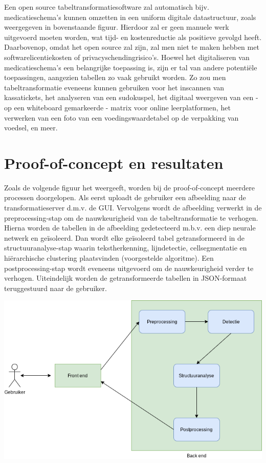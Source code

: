 \documentclass[a0,portrait]{a0poster}
\begin{document}
\begin{multicols}{2}
\noindent Een open source tabeltransformatiesoftware zal automatisch bijv. medicatieschema’s kunnen omzetten in een uniform digitale datastructuur, zoals weergegeven in bovenstaande figuur. Hierdoor zal er geen manuele werk uitgevoerd moeten worden, wat tijd- en kostenreductie als positieve gevolgd heeft. Daarbovenop, omdat het open source zal zijn, zal men niet te maken hebben met softwarelicentiekosten of privacyschendingrisico's. Hoewel het digitaliseren van medicatieschema’s een belangrijke toepassing is, zijn er tal van andere potentiële toepassingen, aangezien tabellen zo vaak gebruikt worden. Zo zou men tabeltransformatie eveneens kunnen gebruiken voor het inscannen van kassatickets, het analyseren van een sudokuspel, het digitaal weergeven van een - op een whiteboard gemarkeerde - matrix voor online leerplatformen, het verwerken van een foto van een voedingswaardetabel op de verpakking van voedsel, en meer.
\color{Black} %
\color{HoGentAccent1} 
\section*{Proof-of-concept en resultaten}
\color{black}
Zoals de volgende figuur het weergeeft, worden bij de proof-of-concept meerdere processen doorgelopen. Als eerst uploadt de gebruiker een afbeelding naar de transformatieserver d.m.v. de GUI. Vervolgens wordt de afbeelding verwerkt in de preprocessing-stap om de nauwkeurigheid van de tabeltransformatie te verhogen. Hierna worden de tabellen in de afbeelding gedetecteerd m.b.v. een diep neurale netwerk en geïsoleerd. Dan wordt elke geïsoleerd tabel getransformeerd in de structuuranalyse-stap waarin tekstherkenning, lijndetectie, cellsegmentatie en hiërarchische clustering plaatsvinden (voorgestelde algoritme). Een postprocessing-stap wordt eveneens uitgevoerd om de nauwkeurigheid verder te verhogen. Uiteindelijk worden de getransformeerde tabellen in JSON-formaat teruggestuurd naar de gebruiker.

\begin{center}\vspace{1cm}
\includegraphics[width=0.8\linewidth]{proof_of_concept_architectuur.png}
\end{center}\vspace{1cm}


\end{multicols}
\end{document}
